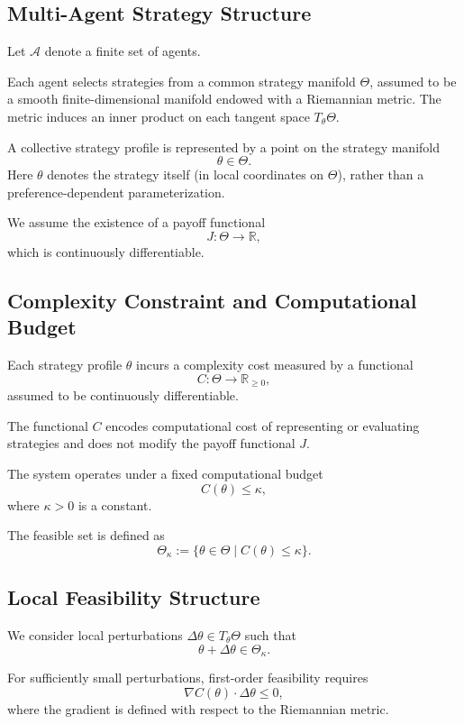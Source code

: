 \documentclass[11pt,a4paper,twocolumn]{article}
\begin{document}
\subsection{Multi-Agent Strategy Structure}

Let $\mathcal{A}$ denote a finite set of agents.

Each agent selects strategies from a common strategy manifold $\Theta$, assumed to be a smooth finite-dimensional manifold endowed with a Riemannian metric. The metric induces an inner product on each tangent space $T_\theta \Theta$.

A collective strategy profile is represented by a point on the strategy manifold
\[
\theta \in \Theta.
\]
Here $\theta$ denotes the strategy itself (in local coordinates on $\Theta$), rather than a preference-dependent parameterization.

We assume the existence of a payoff functional
\[
J : \Theta \rightarrow \mathbb{R},
\]
which is continuously differentiable.

\subsection{Complexity Constraint and Computational Budget}

Each strategy profile $\theta$ incurs a complexity cost measured by a functional
\[
C : \Theta \rightarrow \mathbb{R}_{\ge 0},
\]
assumed to be continuously differentiable.

The functional $C$ encodes computational cost of representing or evaluating strategies and does not modify the payoff functional $J$.

The system operates under a fixed computational budget
\[
C(\theta) \leq \kappa,
\]
where $\kappa > 0$ is a constant.

The feasible set is defined as
\[
\Theta_\kappa := \{ \theta \in \Theta \mid C(\theta) \le \kappa \}.
\]

\subsection{Local Feasibility Structure}

We consider local perturbations $\Delta \theta \in T_\theta \Theta$ such that
\[
\theta + \Delta \theta \in \Theta_\kappa.
\]

For sufficiently small perturbations, first-order feasibility requires
\[
\nabla C(\theta) \cdot \Delta \theta \le 0,
\]
where the gradient is defined with respect to the Riemannian metric.
\end{document}
